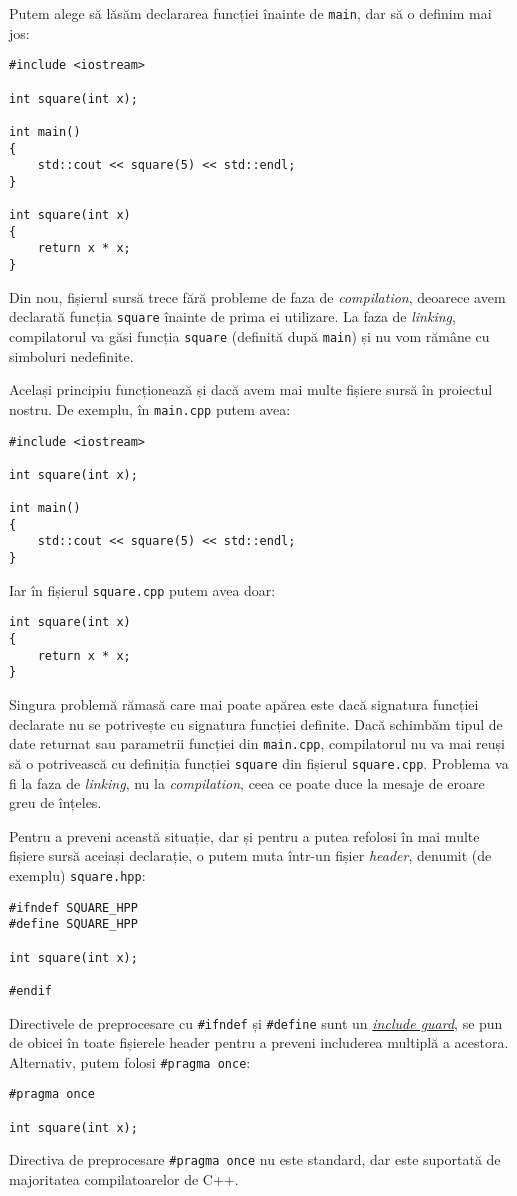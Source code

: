 Putem alege să lăsăm declararea funcției înainte de \texttt{main}, dar să o definim mai jos:
\begin{lstlisting}
#include <iostream>

int square(int x);

int main()
{
    std::cout << square(5) << std::endl;
}

int square(int x)
{
    return x * x;
}
\end{lstlisting}
Din nou, fișierul sursă trece fără probleme de faza de \emph{compilation}, deoarece avem declarată funcția \texttt{square} înainte de prima ei utilizare. La faza de \emph{linking}, compilatorul va găsi funcția \texttt{square} (definită după \texttt{main}) și nu vom rămâne cu simboluri nedefinite.

Același principiu funcționează și dacă avem mai multe fișiere sursă în proiectul nostru. De exemplu, în \texttt{main.cpp} putem avea:
\begin{lstlisting}
#include <iostream>

int square(int x);

int main()
{
    std::cout << square(5) << std::endl;
}
\end{lstlisting}
Iar în fișierul \texttt{square.cpp} putem avea doar:
\begin{lstlisting}   
int square(int x)
{
    return x * x;
}
\end{lstlisting}

Singura problemă rămasă care mai poate apărea este dacă signatura funcției declarate nu se potrivește cu signatura funcției definite. Dacă schimbăm tipul de date returnat sau parametrii funcției din \texttt{main.cpp}, compilatorul nu va mai reuși să o potrivească cu definiția funcției \texttt{square} din fișierul \texttt{square.cpp}. Problema va fi la faza de \emph{linking}, nu la \emph{compilation}, ceea ce poate duce la mesaje de eroare greu de înțeles.

Pentru a preveni această situație, dar și pentru a putea refolosi în mai multe fișiere sursă aceiași declarație, o putem muta într-un fișier \emph{header}, denumit (de exemplu) \texttt{square.hpp}:
\begin{lstlisting}
#ifndef SQUARE_HPP
#define SQUARE_HPP

int square(int x);

#endif
\end{lstlisting}
Directivele de preprocesare cu \texttt{\#ifndef} și \texttt{\#define} sunt un \href{https://en.wikipedia.org/wiki/Include_guard}{\emph{include guard}}, se pun de obicei în toate fișierele header pentru a preveni includerea multiplă a acestora. Alternativ, putem folosi \texttt{\#pragma once}:
\begin{lstlisting}
#pragma once

int square(int x);
\end{lstlisting}
Directiva de preprocesare \texttt{\#pragma once} nu este standard, dar este suportată de majoritatea compilatoarelor de C++.

